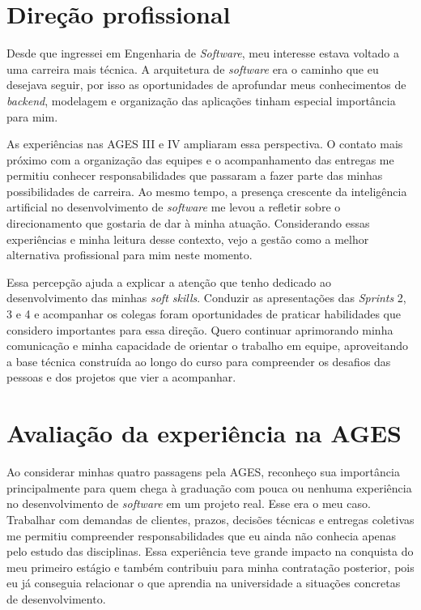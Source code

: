 \section{Direção profissional}

Desde que ingressei em Engenharia de \textit{Software}, meu interesse estava voltado a uma carreira mais técnica. A arquitetura de \textit{software} era o caminho que eu desejava seguir, por isso as oportunidades de aprofundar meus conhecimentos de \textit{backend}, modelagem e organização das aplicações tinham especial importância para mim.

As experiências nas \ac{AGES} III e IV ampliaram essa perspectiva. O contato mais próximo com a organização das equipes e o acompanhamento das entregas me permitiu conhecer responsabilidades que passaram a fazer parte das minhas possibilidades de carreira. Ao mesmo tempo, a presença crescente da inteligência artificial no desenvolvimento de \textit{software} me levou a refletir sobre o direcionamento que gostaria de dar à minha atuação. Considerando essas experiências e minha leitura desse contexto, vejo a gestão como a melhor alternativa profissional para mim neste momento.

Essa percepção ajuda a explicar a atenção que tenho dedicado ao desenvolvimento das minhas \textit{soft skills}. Conduzir as apresentações das \textit{Sprints} 2, 3 e 4 e acompanhar os colegas foram oportunidades de praticar habilidades que considero importantes para essa direção. Quero continuar aprimorando minha comunicação e minha capacidade de orientar o trabalho em equipe, aproveitando a base técnica construída ao longo do curso para compreender os desafios das pessoas e dos projetos que vier a acompanhar.

\section{Avaliação da experiência na AGES}

Ao considerar minhas quatro passagens pela \ac{AGES}, reconheço sua importância principalmente para quem chega à graduação com pouca ou nenhuma experiência no desenvolvimento de \textit{software} em um projeto real. Esse era o meu caso. Trabalhar com demandas de clientes, prazos, decisões técnicas e entregas coletivas me permitiu compreender responsabilidades que eu ainda não conhecia apenas pelo estudo das disciplinas. Essa experiência teve grande impacto na conquista do meu primeiro estágio e também contribuiu para minha contratação posterior, pois eu já conseguia relacionar o que aprendia na universidade a situações concretas de desenvolvimento.

